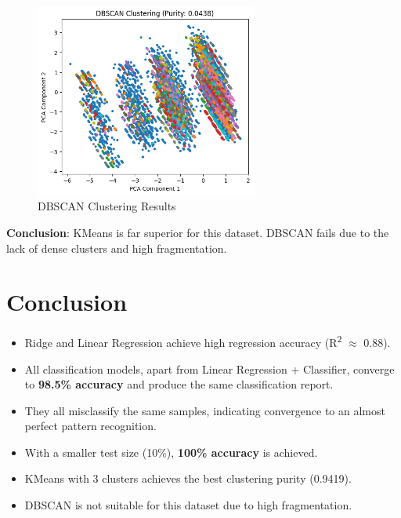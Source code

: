 \documentclass{article}
\begin{document}
\begin{figure}[H]
\centering
\includegraphics[width=0.65\textwidth]{DBScan.png}
\caption{DBSCAN Clustering Results}
\end{figure}

\textbf{Conclusion}: KMeans is far superior for this dataset. DBSCAN fails due to the lack of dense clusters and high fragmentation.

\section{Conclusion}
\begin{itemize}
    \item Ridge and Linear Regression achieve high regression accuracy (R\textsuperscript{2} $\approx$ 0.88).
    \item All classification models, apart from Linear Regression + Classifier, converge to \textbf{98.5\% accuracy} and produce the same classification report.
    \item They all misclassify the same samples, indicating convergence to an almost perfect pattern recognition.
    \item With a smaller test size (10\%), \textbf{100\% accuracy} is achieved.
    \item KMeans with 3 clusters achieves the best clustering purity (0.9419).
    \item DBSCAN is not suitable for this dataset due to high fragmentation.
\end{itemize}
\end{document}
